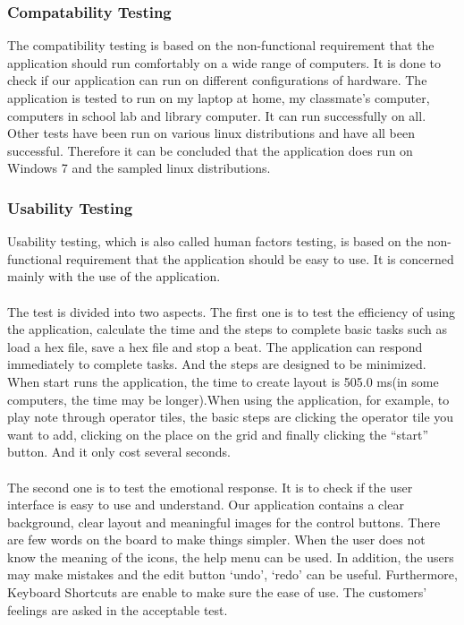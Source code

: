 \documentclass[10pt,a4paper]{article}
\begin{document}
\subsubsection{Compatability Testing}
The compatibility testing is based on the non-functional requirement that the application should run comfortably on a wide range of computers. It is done to check if our application can run on different configurations of hardware. The application is tested to run on my laptop at home, my classmate’s computer, computers in school lab and library computer. It can run successfully on all. Other tests have been run on various linux distributions and have all been successful. Therefore it can be concluded that the application does run on Windows 7 and the sampled linux distributions.\\

\subsubsection{Usability Testing}
Usability testing, which is also called human factors testing, is based on the non-functional requirement that the application should be easy to use. It is concerned mainly with the use of the application.\\
\\
The test is divided into two aspects. The first one is to test the efficiency of using the application, calculate the time and the steps to complete basic tasks such as load a hex file, save a hex file and stop a beat. The application can respond immediately to complete tasks. And the steps are designed to be minimized. When start runs the application, the time to create layout is 505.0 ms(in some computers, the time may be longer).When using the application, for example, to play note through operator tiles, the basic steps are clicking the operator tile you want to add, clicking on the place on the grid and finally clicking the “start” button. And it only cost several seconds.\\
\\
The second one is to test the emotional response. It is to check if the user interface is easy to use and understand. Our application contains a clear background, clear layout and meaningful images for the control buttons. There are few words on the board to make things simpler. When the user does not know the meaning of the icons, the help menu can be used. In addition, the users may make mistakes and the edit button ‘undo’, ‘redo’ can be useful. Furthermore, Keyboard Shortcuts are enable to make sure the ease of use. The customers’ feelings are asked in the acceptable test. 
\end{document}
